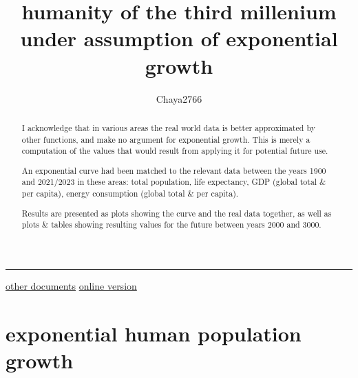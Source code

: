 \documentclass{article}
\author{Chaya2766}
\title{humanity of the third millenium \linebreak under assumption of exponential growth}
\begin{document}
	
	\hyphenchar{}
	
	\maketitle
	
	\begin{abstract}
		I acknowledge that in various areas the real world data is better approximated by other functions, and make no argument for exponential growth. This is merely a computation of the values that would result from applying it for potential future use.
		
		An exponential curve had been matched to the relevant data between the years 1900 and 2021/2023 in these areas: total population, life expectancy, GDP (global total \& per capita), energy consumption (global total \& per capita).
		
		\smallskip
		
		Results are presented as plots showing the curve and the real data together, as well as plots \& tables showing resulting values for the future between years 2000 and 3000.
	\end{abstract}
	
	
	\tableofcontents
	
	\noindent\rule{\textwidth}{0.5px}
	
	\medskip
	
	\noindent
	\href{https://chaya2766.github.io/sciencefictional-docs/}{other documents}
	\hfill
	\href{https://chaya2766.github.io/sciencefictional-docs/third_millenium_exponential_growth.pdf}{online version}
	
	\bigskip
	
	{
		\noindent
		\hfill
	}
	
	\pagebreak
	
	\section{exponential human population growth}
	
	
\end{document}
